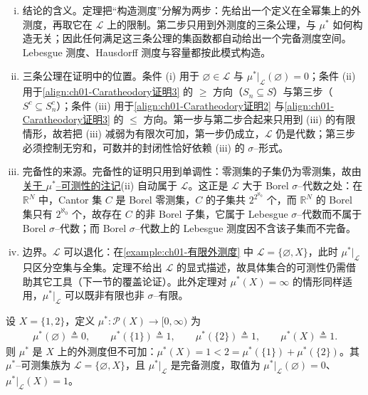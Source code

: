 \documentclass[../../main.tex]{subfiles}%
\begin{document}
\begin{remark}\label{remark:ch01-可测集族}
\begin{enumerate}[(i)]
\item 结论的含义。定理把“构造测度”分解为两步：先给出一个定义在全幂集上的外测度，再取它在 $\mathcal{L}$ 上的限制。第二步只用到外测度的三条公理，与 $\mu^*$ 如何构造无关；因此任何满足这三条公理的集函数都自动给出一个完备测度空间。Lebesgue 测度、Hausdorff 测度与容量都按此模式构造。
\item 三条公理在证明中的位置。条件 (i) 用于 $\varnothing\in\mathcal{L}$ 与 $\mu^*|_{\mathcal{L}}(\varnothing )=0$；条件 (ii) 用于\eqref{align:ch01-Caratheodory证明3} 的 $\geqslant$ 方向（$S_n\subseteq S$）与第三步（$S^c\subseteq S_n^c$）；条件 (iii) 用于\eqref{align:ch01-Caratheodory证明2} 与\eqref{align:ch01-Caratheodory证明3} 的 $\leqslant$ 方向。第一步与第二步合起来只用到 (iii) 的有限情形，故若把 (iii) 减弱为有限次可加，第一步仍成立，$\mathcal{L}$ 仍是代数；第三步必须控制无穷和，可数并的封闭性恰好依赖 (iii) 的 $\sigma$--形式。
\item 完备性的来源。完备性的证明只用到单调性：零测集的子集仍为零测集，故由\hyperref[remark:ch01-外测度可测]{关于 $\mu^*$--可测性的注记}(ii) 自动属于 $\mathcal{L}$。这正是 $\mathcal{L}$ 大于 Borel $\sigma$--代数之处：在 $\mathbb{R}^N$ 中，Cantor 集 $C$ 是 Borel 零测集，$C$ 的子集共 $2^{2^{\aleph_0}}$ 个，而 $\mathbb{R}^N$ 的 Borel 集只有 $2^{\aleph_0}$ 个，故存在 $C$ 的非 Borel 子集，它属于 Lebesgue $\sigma$--代数而不属于 Borel $\sigma$--代数；而 Borel $\sigma$--代数上的 Lebesgue 测度因不含该子集而不完备。
\item 边界。$\mathcal{L}$ 可以退化：在\cref{example:ch01-有限外测度} 中 $\mathcal{L}=\{\varnothing ,X\}$，此时 $\mu^*|_{\mathcal{L}}$ 只区分空集与全集。定理不给出 $\mathcal{L}$ 的显式描述，故具体集合的可测性仍需借助其它工具（下一节的覆盖论证）。此外定理对 $\mu^*(X)=\infty$ 的情形同样适用，$\mu^*|_{\mathcal{L}}$ 可以既非有限也非 $\sigma$--有限。
\end{enumerate}
\end{remark}

\begin{example}\label{example:ch01-有限外测度}
设 $X=\{1,2\}$，定义 $\mu^*:\mathcal{P}(X)\to[0,\infty)$ 为
\begin{align*}
\mu^*(\varnothing )\triangleq 0,\qquad \mu^*(\{1\})\triangleq 1,\qquad \mu^*(\{2\})\triangleq 1,\qquad \mu^*(X)\triangleq 1.
\end{align*}
则 $\mu^*$ 是 $X$ 上的外测度但不可加：$\mu^*(X)=1<2=\mu^*(\{1\})+\mu^*(\{2\})$。其 $\mu^*$--可测集族为 $\mathcal{L}=\{\varnothing ,X\}$，且 $\mu^*|_{\mathcal{L}}$ 是完备测度，取值为 $\mu^*|_{\mathcal{L}}(\varnothing )=0$、$\mu^*|_{\mathcal{L}}(X)=1$。
\end{example}
\end{document}
